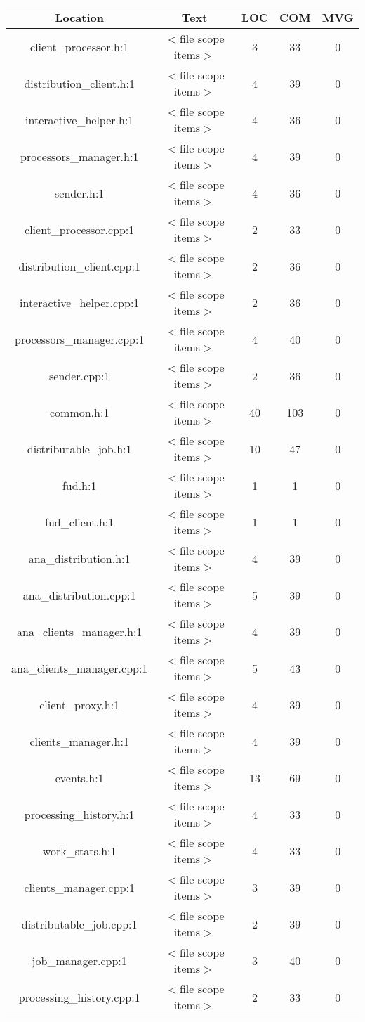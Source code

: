 \begin{tabular}{|c|c|c|c|c|}
\hline 
Location &Text &LOC &COM &MVG \\
 \hline 
client\_processor.h:1
 &$<$file scope items$>$ & 3 & 33 & 0 \\
 \hline 
distribution\_client.h:1
 &$<$file scope items$>$ & 4 & 39 & 0 \\
 \hline 
interactive\_helper.h:1
 &$<$file scope items$>$ & 4 & 36 & 0 \\
 \hline 
processors\_manager.h:1
 &$<$file scope items$>$ & 4 & 39 & 0 \\
 \hline 
sender.h:1
 &$<$file scope items$>$ & 4 & 36 & 0 \\
 \hline 
client\_processor.cpp:1
 &$<$file scope items$>$ & 2 & 33 & 0 \\
 \hline 
distribution\_client.cpp:1
 &$<$file scope items$>$ & 2 & 36 & 0 \\
 \hline 
interactive\_helper.cpp:1
 &$<$file scope items$>$ & 2 & 36 & 0 \\
 \hline 
processors\_manager.cpp:1
 &$<$file scope items$>$ & 4 & 40 & 0 \\
 \hline 
sender.cpp:1
 &$<$file scope items$>$ & 2 & 36 & 0 \\
 \hline 
common.h:1
 &$<$file scope items$>$ & 40 & 103 & 0 \\
 \hline 
distributable\_job.h:1
 &$<$file scope items$>$ & 10 & 47 & 0 \\
 \hline 
fud.h:1
 &$<$file scope items$>$ & 1 & 1 & 0 \\
 \hline 
fud\_client.h:1
 &$<$file scope items$>$ & 1 & 1 & 0 \\
 \hline 
ana\_distribution.h:1
 &$<$file scope items$>$ & 4 & 39 & 0 \\
 \hline 
ana\_distribution.cpp:1
 &$<$file scope items$>$ & 5 & 39 & 0 \\
 \hline 
ana\_clients\_manager.h:1
 &$<$file scope items$>$ & 4 & 39 & 0 \\
 \hline 
ana\_clients\_manager.cpp:1
 &$<$file scope items$>$ & 5 & 43 & 0 \\
 \hline 
client\_proxy.h:1
 &$<$file scope items$>$ & 4 & 39 & 0 \\
 \hline 
clients\_manager.h:1
 &$<$file scope items$>$ & 4 & 39 & 0 \\
 \hline 
events.h:1
 &$<$file scope items$>$ & 13 & 69 & 0 \\
 \hline 
processing\_history.h:1
 &$<$file scope items$>$ & 4 & 33 & 0 \\
 \hline 
work\_stats.h:1
 &$<$file scope items$>$ & 4 & 33 & 0 \\
 \hline 
clients\_manager.cpp:1
 &$<$file scope items$>$ & 3 & 39 & 0 \\
 \hline 
distributable\_job.cpp:1
 &$<$file scope items$>$ & 2 & 39 & 0 \\
 \hline 
job\_manager.cpp:1
 &$<$file scope items$>$ & 3 & 40 & 0 \\
 \hline 
processing\_history.cpp:1
 &$<$file scope items$>$ & 2 & 33 & 0 \\
 \hline 

\end{tabular}

